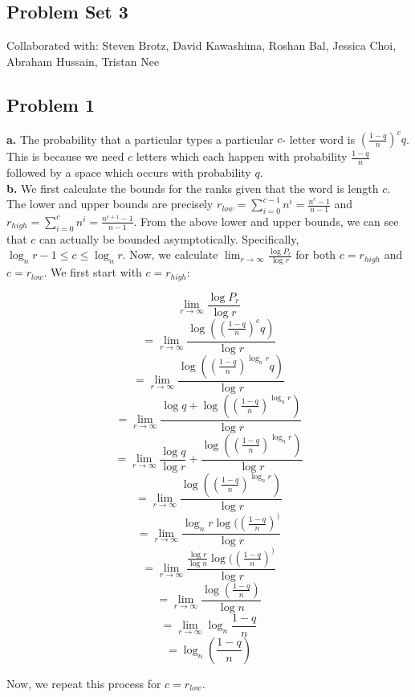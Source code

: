 \documentclass[12 pt]{article}
\begin{document}
	\begin{center}
		\section*{Problem Set 3}
	\end{center}

	\noindent Collaborated with: Steven Brotz, David Kawashima, Roshan Bal, Jessica Choi, Abraham Hussain, Tristan Nee \\

	\subsection*{Problem 1}
	\noindent \textbf{a.} The probability that a particular types a particular $c$- letter word is $(\frac{1-q}{n})^c q$. This is because we need $c$ letters which each happen with probability $\frac{1-q}{n}$ followed by a space which occurs with probability $q$. \\
	
	\noindent \textbf{b.} We first calculate the bounds for the ranks given that the word is length $c$. The lower and upper bounds are precisely $r_{low} = \sum_{i=0}^{c-1} n^i = \frac{n^c-1}{n-1}$ and $r_{high} =\sum_{i=0}^c n^i = \frac{n^{c+1} - 1}{n-1}$. From the above lower and upper bounds, we can see that $c$ can actually be bounded asymptotically. Specifically, $\log_n r - 1 \leq c \leq \log_n r$. Now, we calculate $\lim_{r \rightarrow \infty} \frac {\log P_r}{\log r}$ for both $c = r_{high}$ and $c = r_{low}$. We first start with $c = r_{high}$:
	
	\[\lim_{r \rightarrow \infty} \frac {\log P_r}{\log r}\]
	\[ = \lim_{r \rightarrow \infty} \frac {\log ((\frac{1-q}{n})^c q)}{\log r}\]
	\[ = \lim_{r \rightarrow \infty} \frac {\log ((\frac{1-q}{n})^{\log_n r} q)}{\log r}\]
	\[ = \lim_{r \rightarrow \infty} \frac {\log q + \log ((\frac{1-q}{n})^{\log_n r})}{\log r}\]
	\[ = \lim_{r \rightarrow \infty} \frac{\log q}{\log r} + \frac {\log ((\frac{1-q}{n})^{\log_n r})}{\log r}\]
	\[ = \lim_{r \rightarrow \infty} \frac {\log ((\frac{1-q}{n})^{\log_n r})}{\log r}\]
	\[ = \lim_{r \rightarrow \infty} \frac {\log_n r\log ((\frac{1-q}{n})^)}{\log r}\]
	\[ = \lim_{r \rightarrow \infty} \frac {\frac{\log r}{\log n} \log ((\frac{1-q}{n})^)}{\log r}\]
	\[ = \lim_{r \rightarrow \infty} \frac{\log (\frac{1-q}{n})} {\log n} \]
	\[ = \lim_{r \rightarrow \infty} \log_n {\frac{1-q}{n}} \]
	\[ = \log_n ({\frac{1-q}{n}}) \]
	
	\noindent Now, we repeat this process for $c = r_{low}$. 
	
\end{document}
